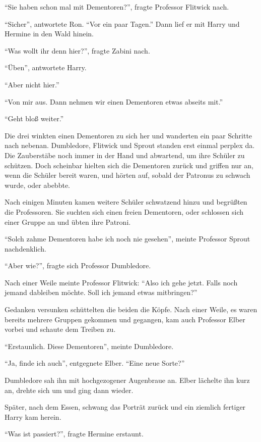 \enquote{Sie haben schon mal mit Dementoren\abs?}, fragte Professor Flitwick nach.

\enquote{Sicher}, antwortete Ron. \enquote{Vor ein paar Tagen.}  Dann lief er mit Harry und Hermine in den Wald hinein.

\enquote{Was wollt ihr denn hier?}, fragte Zabini nach.

\enquote{Üben}, antwortete Harry.

\enquote{Aber nicht hier.}

\enquote{Von mir aus. Dann nehmen wir einen Dementoren etwas abseits mit.}

\enquote{Geht bloß weiter.}

Die drei winkten einen Dementoren zu sich her und wanderten ein paar Schritte nach nebenan. Dumbledore, Flitwick und Sprout standen erst einmal perplex da. Die Zauberstäbe noch immer in der Hand und abwartend, um ihre Schüler zu schützen. Doch scheinbar hielten sich die Dementoren zurück und griffen nur an, wenn die Schüler bereit waren, und hörten auf, sobald der Patronus zu schwach wurde, oder abebbte.

Nach einigen Minuten kamen weitere Schüler schwatzend hinzu und begrüßten die Professoren. Sie suchten sich einen freien Dementoren, oder schlossen sich einer Gruppe an und übten ihre Patroni.

\enquote{Solch zahme Dementoren habe ich noch nie gesehen}, meinte Professor Sprout nachdenklich.

\enquote{Aber wie\abs?}, fragte sich Professor Dumbledore.

Nach einer Weile meinte Professor Flitwick: \enquote{Also ich gehe jetzt. Falls noch jemand dableiben möchte. \gst Soll ich jemand etwas mitbringen?}

Gedanken versunken schüttelten die beiden die Köpfe. Nach einer Weile, es waren bereits mehrere Gruppen gekommen und gegangen, kam auch Professor Elber vorbei und schaute dem Treiben zu.

\enquote{Erstaunlich. Diese Dementoren}, meinte Dumbledore.

\enquote{Ja, finde ich auch}, entgegnete Elber. \enquote{Eine neue Sorte?}

Dumbledore sah ihn mit hochgezogener Augenbraue an. Elber lächelte ihn kurz an, drehte sich um und ging dann wieder.

Später, nach dem Essen, schwang das Porträt zurück und ein ziemlich fertiger Harry kam herein.

\enquote{Was ist passiert?}, fragte Hermine erstaunt.

